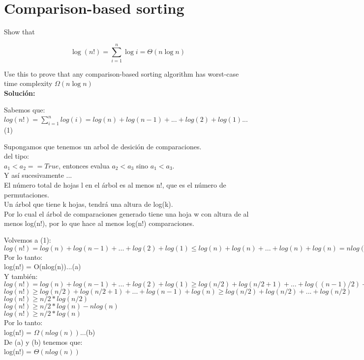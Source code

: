 \documentclass{article}
\begin{document}
\section{Comparison-based sorting}
Show that

$$
\log(n!) = \sum_{i=1}^{n}\log i = \Theta(n\log n)
$$

Use this to prove that any comparison-based sorting algorithm has worst-case time complexity $\Omega(n \log n)$\\

    \textbf{Solución:}

    Sabemos que:\\
    $log(n!)=\sum_{i=1}^{n} log(i) = log(n) + log(n-1) + ... + log(2) + log(1)$...(1)

    Supongamos que tenemos un arbol de desición de comparaciones.\\
    del tipo:\\    
    $a_1 < a_2 == True$, entonces evalua $a_2 < a_3$ sino $a_1 < a_3$.\\
    Y así sucesivamente ...\\
    El número total de hojas l en el árbol es al menos n!, que es el número de permutaciones.\\
    Un árbol que tiene k hojas, tendrá una altura de log(k).\\
    Por lo cual el árbol de comparaciones generado tiene una hoja w con altura de al menos log(n!), por lo que hace al menos log(n!) comparaciones.
    
    Volvemos a (1):\\
    $log(n!)=log(n) + log(n-1) + ... + log(2) + log(1) \leq log(n) + log(n) + ... + log(n) + log(n) = nlog(n)$\\
    Por lo tanto:\\
    log(n!) = O(nlog(n))...(a)\\
    
    Y también:\\
    $log(n!)=log(n) + log(n-1) + ... + log(2) + log(1) \geq log(n/2) + log(n/2+1) + ... + log((n-1)/2)+log(n)$\\
    $log(n!)\geq log(n/2) + log(n/2+1) + ... + log(n-1) +log(n)\geq log(n/2) + log(n/2) + ... + log(n/2)$\\
    $log(n!)\geq n/2 * log(n/2)$\\
    $log(n!)\geq n/2 * log(n)-nlog(n)$\\
    $log(n!)\geq n/2 * log(n)$\\
    Por lo tanto:\\
    log(n!) = $\Omega(nlog(n))$...(b)\\
    
    De (a) y (b) tenemos que:\\
    log(n!) = $\Theta (nlog(n))$
    
 
\end{document}
